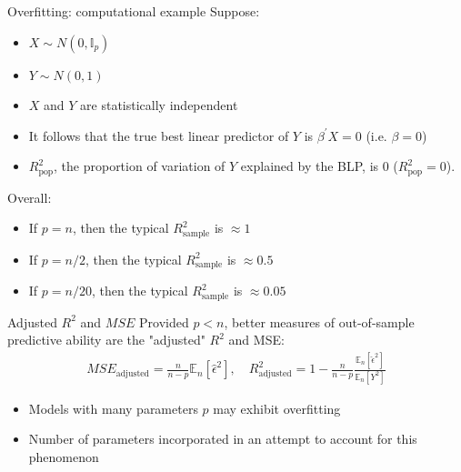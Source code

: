 \documentclass[compress, 8pt]{beamer}
\begin{document}
\begin{frame}{Overfitting: computational example}
    Suppose:
    \begin{itemize}
    \item $X \sim N(0, \mathbb{I}_p)$
    \item $Y \sim N(0, 1)$
    \item $X$ and $Y$ are statistically independent
    \item [$\implies$] It follows that the true best linear predictor of $Y$ is $\beta^\prime X = 0$ (i.e. $\beta = 0$)
    \item [$\implies$] $R^2_{\text{pop}}$, the proportion of variation of $Y$ explained by the BLP, is 0 ($R^2_{\text{pop}} = 0$).
    \end{itemize}

    \pause
    \vspace{2ex}
    Overall:
    \begin{itemize}
        \item If $p=n$, then the typical $R^2_{\text{sample}}$ is $\approx 1$
        \item If $p = n/2$, then the typical $R^2_{\text{sample}}$ is $\approx 0.5$
        \item If $p = n/20$, then the typical $R^2_{\text{sample}}$ is $\approx 0.05$
    \end{itemize}

\end{frame}

\begin{frame}{Adjusted $R^2$ and $MSE$}
Provided $p < n$, better measures of out-of-sample predictive
ability are the "adjusted" $R^2$ and MSE:
\begin{align*}
    MSE_{\text{adjusted}} = \frac{n}{n - p} \mathbb{E}_n[\hat{\epsilon}^2], \quad R^2_{\text{adjusted}} = 1 - \frac{n}{n - p} \frac{\mathbb{E}_n[\hat{\epsilon}^2]}{\mathbb{E}_n [Y^2]}
\end{align*}

\begin{itemize}
    \item Models with many parameters $p$ may exhibit overfitting
    \item Number of parameters incorporated in an attempt to
account for this phenomenon
\end{itemize}


\end{frame}
\end{document}
